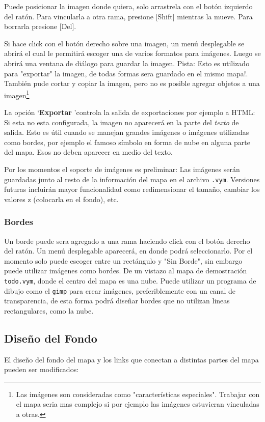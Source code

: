 \documentclass{article}
\newcommand{\key}[1]{[#1]}
\begin{document}
Puede posicionar la imagen donde quiera, solo arrastrela con el bot\'on izquierdo del rat\'on. Para vincularla a otra rama, presione \key{Shift} mientras la mueve. Para borrarla presione \key{Del}. 	

Si hace click con el bot\'on derecho sobre una imagen, un men\'u desplegable se abrir\'a el cual le permitir\'a escoger una de varios formatos para im\'agenes. Luego se abrir\'a una ventana de di\'alogo para guardar la imagen. Pista: Esto es utilizado para "exportar" la imagen, de todas formas sera guardado en el mismo mapa!. Tambi\'en pude cortar y copiar la imagen, pero no es posible agregar objetos a una imagen\footnote{
	Las im\'agenes son consideradas como "caracter\'isticas especiales". Trabajar con el mapa seria mas complejo si por ejemplo las im\'agenes estuvieran vinculadas a otras.}
	
La opci\'on \lq{\bf Exportar} \rq controla la salida de exportaciones por ejemplo a HTML: Si esta no esta configurada, la imagen no aparecer\'a en la parte del {\em texto} de salida. Esto es \'util cuando se manejan grandes im\'agenes o im\'agenes utilizadas como bordes, por ejemplo el famoso s\'imbolo en forma de nube en alguna parte del mapa. Esos no deben aparecer en medio del texto.

Por los momentos el soporte de im\'agenes es preliminar: Las im\'agenes ser\'an guardadas junto al resto de la informaci\'on del mapa en el archivo {\tt .vym}.
Versiones futuras incluir\'an mayor funcionalidad como redimensionar el tama\~no, cambiar los valores z (colocarla en el fondo), etc.

\subsubsection*{Bordes}
Un borde puede sera agregado a una rama haciendo click con el bot\'on derecho del rat\'on. Un men\'u desplegable aparecer\'a, en donde podr\'a seleccionarlo. Por el momento solo puede escoger entre un rect\'angulo y "Sin Borde", sin embargo puede utilizar im\'agenes como bordes. De un vistazo al mapa de demostraci\'on {\tt todo.vym}, donde el centro del mapa es una nube. Puede utilizar un programa de dibujo como el {\tt gimp} para crear im\'agenes, preferiblemente con un canal de transparencia, de esta forma podr\'a dise\~nar bordes que no utilizan lineas rectangulares, como la nube.

\subsection{Dise\~no del Fondo}
El dise\~no del fondo del mapa y los links que conectan a distintas partes del mapa pueden ser modificados:
\end{document}
